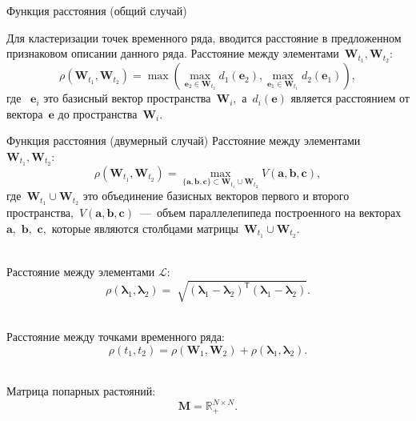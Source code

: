 \documentclass[10pt,pdf,hyperref={unicode}]{beamer}
\begin{document}
\begin{frame}{Функция расстояния (общий случай)}
\justifying

Для кластеризации точек временного ряда, вводится расстояние в предложенном признаковом описании данного ряда. Расстояние между элементами~$\mathbf{W}_{t_1},\mathbf{W}_{t_2}$:\\
$$\rho\left(\textbf{W}_{t_1}, \textbf{W}_{t_2}\right) = \max\left(\max_{\textbf{e}_2 \in \textbf{W}_{t_2}} d_{1}\left(\textbf{e}_2\right), \max_{\textbf{e}_1 \in \textbf{W}_{t_1}} d_{2}\left(\textbf{e}_1\right)\right),$$
где ~$\textbf{e}_i$ это базисный вектор пространства~$\textbf{W}_i,$ а~$d_i\left(\textbf{e}\right)$ является расстоянием от вектора~$\textbf{e}$ до пространства~$\textbf{W}_i$.


\end{frame}


\begin{frame}[shrink=5]{Функция расстояния (двумерный случай)}
\justifying
Расстояние между элементами~$\mathbf{W}_{t_1},\mathbf{W}_{t_2}$:\\
$$
\rho\left(\textbf{W}_{t_1}, \textbf{W}_{t_2}\right) = \max_{\{\textbf{a},\textbf{b},\textbf{c}\} \subset \textbf{W}_{t_1}\cup \textbf{W}_{t_2} } V\left(\textbf{a},\textbf{b},\textbf{c}\right), 
$$
где~$\textbf{W}_{t_1}\cup\textbf{W}_{t_2}$ это объединение базисных векторов первого и второго пространства,~$V\left(\textbf{a},\textbf{b},\textbf{c}\right)$~---~объем параллелепипеда построенного на векторах~$\textbf{a},$ $\textbf{b},$ $\textbf{c},$ которые являются столбцами матрицы~$\textbf{W}_{t_1}\cup\textbf{W}_{t_2}$.

~\\
Расстояние между элементами $\mathcal{L}$:\\
$$
\rho\left(\bm{\lambda}_1, \bm{\lambda}_2\right) = \sqrt[]{\left(\bm{\lambda}_1 - \bm{\lambda}_2\right)^{\mathsf{T}}\left(\bm{\lambda}_1 - \bm{\lambda}_2\right)}.
$$

~\\
Расстояние между точками временного ряда:\\
$$
\rho\left(t_1, t_2\right) = \rho\left(\textbf{W}_1, \textbf{W}_2\right) + \rho\left(\bm{\lambda}_1, \bm{\lambda}_2\right).
$$

~\\
Матрица попарных растояний:\\
$$\textbf{M} = \mathbb{R}_{+}^{N\times N}.$$

\end{frame}
\end{document}
